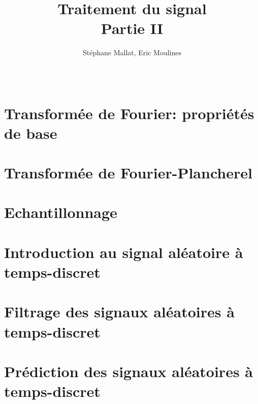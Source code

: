 \documentclass[a4paper,11pt]{book}
\title{Traitement du signal\\
Partie II}
\author{St\'ephane Mallat, Eric Moulines}
\date{\ }
\theoremstyle{break}
\begin{document}
\maketitle
\tableofcontents

\chapter{Transform{\'e}e de Fourier: propri{\'e}t{\'e}s de base}


\chapter{Transform{\'e}e de Fourier-Plancherel}

\chapter{Echantillonnage}


\chapter{Introduction au signal al\'eatoire \`a temps-discret}


\chapter{Filtrage des signaux al\'eatoires \`a temps-discret}

\chapter{Pr\'ediction des signaux al\'eatoires \`a temps-discret}

%

%



\end{document}
